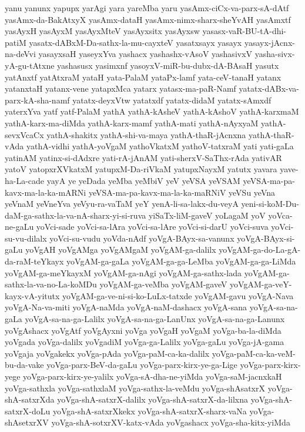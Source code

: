 {yanu
yanunx
yapupx
yarAgi
yara
yareMba
yaru
yasAmx-ciCx-va-parx-sA-dAtf
yasAmx-da-BakAtxyX
yasAmx-dataH
yasAmx-nimx-sharx-sheYvAH
yasAmxtf
yasAyxH
yasAyxM
yasAyxMteV
yasAyxsitx
yasAyxsw
yasasx-vaR-BU-tA-dhi-patiM
yasatx-dABxM-Da-sathx-la-mu-cayxteV
yasatxsayx
yasayx
yasayx-jAcnx-na-deVvi
yasayxsaH
yaseyxYva
yashacx
yashashx-vAsoV
yashasivxV
yasha-sivx-yA-gu-tAtxne
yashasusx
yasimxnf
yasoyxV-miR-bu-dubx-dA-BAsaH
yasutx
yatAnxtf
yatAtxraM
yataH
yata-PalaM
yataPx-lamf
yata-ceV-tanaH
yatanx
yatanxtaH
yatanx-vene
yatapxMca
yatarx
yatasx-ma-paR-Namf
yatatx-dABx-va-parx-kA-sha-namf
yatatx-deyxVtw
yatatxdf
yatatx-didaM
yatatx-sAmxdf
yaterxYva
yatf
yatf-PalaM
yathA
yathA-kAsheV
yathA-kAshoV
yathA-karxmaM
yathA-karx-ma-diMda
yathA-karx-mamf
yathA-mati
yathA-nAyxyaM
yathA-sevxVcaCx
yathA-shakitx
yathA-shi-va-maya
yathA-thaR-jAcnxna
yathA-thaR-vAda
yathA-vidhi
yathA-yoVgaM
yathoVkatxM
yathoV-tatxraM
yati
yati-gaLa
yatinAM
yatinx-si-dAdxre
yati-rA-jAnAM
yati-sherxV-SaThx-rAda
yativAR
yatoV
yatopxrXVkatxM
yatupxM-Da-riVkaM
yatupxNayxM
yatutx
yavara
yave-ha-La-cade
yayA
ye
yeDada
yeMba
yeMbiV
yeV
yeVSA
yeVSAM
yeVSA-ma-pa-kavx-ma-la-ka-mARNi
yeVSA-ma-pa-kavx-ma-la-ka-maRNiV
yeVSu
yeVna
yeVnaM
yeVneYva
yeVyu-ra-vaTaM
yeY
yenA-li-sa-lakx-du-veyA
yeni-si-koM-Du-daM-ga-sathx-la-va-nA-sharx-yi-si-ruva
yiSaTx-liM-gaveV
yoLagaM
yoV
yoVca-ne-gaLu
yoVci-sade
yoVci-sa-lAra
yoVci-sa-lAre
yoVci-si-darU
yoVci-suva
yoVci-su-vu-dilalx
yoVci-su-vudu
yoVda-nAdf
yoVgA-BAyx-sa-vanunx
yoVgA-BAyx-si-gaLu
yoVgAH
yoVgAMga
yoVgAMgaM
yoVgAM-ga-dalilx
yoVgAM-ga-do-La-gA-da-raM-teYkayx
yoVgAM-ga-gaLa
yoVgAM-ga-ga-LeMba
yoVgAM-ga-ga-LiMda
yoVgAM-ga-meYkayxM
yoVgAM-ga-nAgi
yoVgAM-ga-sathx-lada
yoVgAM-ga-sathx-la-va-no-La-koMDu
yoVgAM-ga-veMba
yoVgAM-gaveV
yoVgAM-ga-veY-kayx-vA-yitutx
yoVgAM-ga-ve-ni-si-ko-LuLx-tatxde
yoVgAM-gavu
yoVgA-Nava
yoVgA-Na-va-miti
yoVgA-naMda
yoVgA-naM-dashacx
yoVgA-sana
yoVgA-sa-na-gaLa
yoVgA-sa-na-ga-Lalilx
yoVgA-sa-na-ga-LanUnx
yoVgA-sa-na-ga-Lanunx
yoVgAshacx
yoVgAtf
yoVgAyxni
yoVga
yoVgaH
yoVgaM
yoVga-ba-la-diMda
yoVgada
yoVga-dalilx
yoVgadiM
yoVga-ga-Lalilx
yoVga-gaLu
yoVga-jA-gama
yoVgaja
yoVgakekx
yoVga-pAda
yoVga-paM-ca-ka-dalilx
yoVga-paM-ca-ka-veM-bu-da-vake
yoVga-parx-BeV-da-gaLu
yoVga-parx-kirx-ye-ga-Lige
yoVga-parx-kirx-yege
yoVga-parx-kirx-ye-yalilx
yoVga-sA-dha-ne-yiMda
yoVga-saM-jacnxkaH
yoVga-sathxla
yoVga-sathxlaM
yoVga-sathx-la-veMdu
yoVga-shAsatxrX
yoVga-shA-satxrXda
yoVga-shA-satxrX-dalilx
yoVga-shA-satxrX-da-lilxna
yoVga-shA-satxrX-doLu
yoVga-shA-satxrXkekx
yoVga-shA-satxrX-sharx-vaNa
yoVga-shAsetxrXV
yoVga-shA-sotxrXV-katx-vAda
yoVgashacx
yoVga-sha-kitx-yiMda
}
